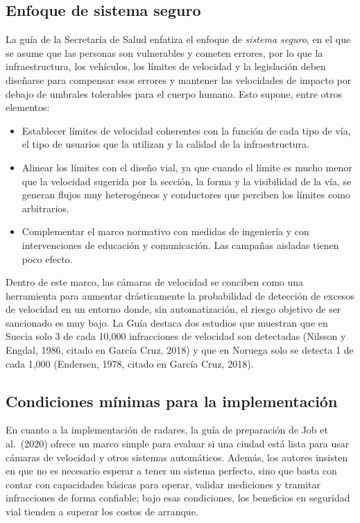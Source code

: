 \subsection{Enfoque de sistema seguro}

\noindent La guía de la Secretaría de Salud enfatiza el enfoque de \emph{sistema seguro}, en el que se asume que las personas son vulnerables y cometen errores, por lo que la infraestructura, los vehículos, los límites de velocidad y la legislación deben diseñarse para compensar esos errores y mantener las velocidades de impacto por debajo de umbrales tolerables para el cuerpo humano. Esto supone, entre otros elementos:

\begin{itemize}
    \item Establecer límites de velocidad coherentes con la función de cada tipo de vía, el tipo de usuarios que la utilizan y la calidad de la infraestructura.
    \item Alinear los límites con el diseño vial, ya que cuando el límite es mucho menor que la velocidad sugerida por la sección, la forma y la visibilidad de la vía, se generan flujos muy heterogéneos y conductores que perciben los límites como arbitrarios.
    \item Complementar el marco normativo con medidas de ingeniería y con intervenciones de educación y comunicación. Las campañas aisladas tienen poco efecto.
\end{itemize}

Dentro de este marco, las cámaras de velocidad se conciben como una herramienta para aumentar drásticamente la probabilidad de detección de excesos de velocidad en un entorno donde, sin automatización, el riesgo objetivo de ser sancionado es muy bajo. La Guía destaca dos estudios que muestran que en Suecia solo 3 de cada 10,000 infracciones de velocidad son detectadas (Nilsson y Engdal, 1986, citado en García Cruz, 2018) y que en Noruega solo se detecta 1 de cada 1,000 (Endersen, 1978, citado en García Cruz, 2018).\\

\subsection{Condiciones mínimas para la implementación}

\noindent En cuanto a la implementación de radares, la guía de preparación de Job et al.\ (2020) ofrece un marco simple para evaluar si una ciudad está lista para usar cámaras de velocidad y otros sistemas automáticos. Además, los autores insisten en que no es necesario esperar a tener un sistema perfecto, sino que basta con contar con capacidades básicas para operar, validar mediciones y tramitar infracciones de forma confiable; bajo esas condiciones, los beneficios en seguridad vial tienden a superar los costos de arranque.\\


